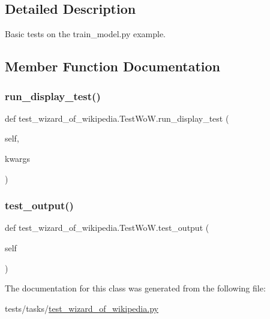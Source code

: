 \subsection{Detailed Description}
\begin{DoxyVerb}Basic tests on the train_model.py example.
\end{DoxyVerb}
 

\subsection{Member Function Documentation}
\mbox{\label{classtest__wizard__of__wikipedia_1_1TestWoW_a8817f78f5eb9d33489bc79c305d174cc}} 
\subsubsection{\texorpdfstring{run\+\_\+display\+\_\+test()}{run\_display\_test()}}
{\footnotesize\ttfamily def test\+\_\+wizard\+\_\+of\+\_\+wikipedia.\+Test\+Wo\+W.\+run\+\_\+display\+\_\+test (\begin{DoxyParamCaption}\item[{}]{self,  }\item[{}]{kwargs }\end{DoxyParamCaption})}

\mbox{\label{classtest__wizard__of__wikipedia_1_1TestWoW_a5a2ccfeb297d1fa8b356bcb9c4ce2225}} 
\subsubsection{\texorpdfstring{test\+\_\+output()}{test\_output()}}
{\footnotesize\ttfamily def test\+\_\+wizard\+\_\+of\+\_\+wikipedia.\+Test\+Wo\+W.\+test\+\_\+output (\begin{DoxyParamCaption}\item[{}]{self }\end{DoxyParamCaption})}



The documentation for this class was generated from the following file\+:\begin{DoxyCompactItemize}
\item 
tests/tasks/\hyperlink{test__wizard__of__wikipedia_8py}{test\+\_\+wizard\+\_\+of\+\_\+wikipedia.\+py}\end{DoxyCompactItemize}
